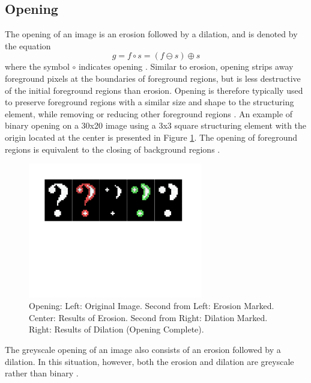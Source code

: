 \documentclass{sig-alternate}
\begin{document}
\subsection{Opening}\label{opening}
The opening of an image is an erosion followed by a dilation, and is denoted by the equation
\begin{equation*}
g = f \circ s = (f \ominus s) \oplus s
\end{equation*}
where the symbol $\circ$ indicates opening \cite{MorphologyWikiAnonymous, MorphologyBook:2000}. Similar to erosion, opening strips away foreground pixels at the boundaries of foreground regions, but is less destructive of the initial foreground regions than erosion. Opening is therefore typically used to preserve foreground regions with a similar size and shape to the structuring element, while removing or reducing other foreground regions \cite{MorphologyWiki}. An example of binary opening on a 30x20 image using a 3x3 square structuring element with the origin located at the center is presented in Figure \ref{binary opening figure}. The opening of foreground regions is equivalent to the closing of background regions \cite{MorphologyWiki}.
\begin{figure}
\centering
\includegraphics[width=3in,trim={0 4.75in 0 0},clip]{opening}
\caption{Opening: Left: Original Image. Second from Left: Erosion Marked. Center: Results of Erosion. Second from Right: Dilation Marked. Right: Results of Dilation (Opening Complete).}
\label{binary opening figure}
\end{figure}

The greyscale opening of an image also consists of an erosion followed by a dilation. In this situation, however, both the erosion and dilation are greyscale rather than binary \cite{MorphologyPaper:1987}.
\end{document}
